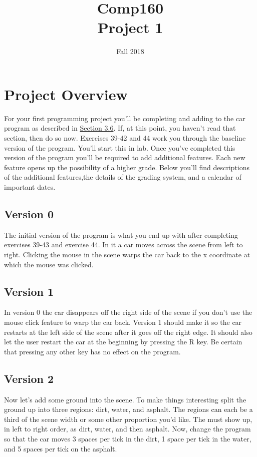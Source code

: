 \documentclass[10pt]{article}
\title{Comp160 \\ Project 1 }
\author{}
\date{ Fall 2018 }
\begin{document}
\maketitle

\section*{Project Overview}

For your first programming project you'll be completing and adding to the car program as described in \href{https://htdp.org/2018-01-06/Book/part_one.html#%28part._.D.K._sec~3adesign-world%29}{Section 3.6}.  If, at this point, you haven't read that section, then do so now. Exercises 39-42 and 44 work you through the baseline version of the program. You'll start this in lab. Once you've completed this version of the program you'll be required to add additional features. Each new feature opens up the possibility of a higher grade. Below you'll find descriptions of the additional features,the details of the grading system, and a calendar of important dates.

\subsection*{Version 0}

The initial version of the program is what you end up with after completing exercises 39-43 and exercise 44. In it a car moves across the scene from left to right. Clicking the mouse in the scene warps the car back to the x coordinate at which the mouse was clicked.

\subsection*{Version 1}

In version 0 the car disappears off the right side of the scene if you don't use the mouse click feature to warp the car back. Version 1 should make it so the car restarts at the left side of the scene after it goes off the right edge. It should also let the user restart the car at the beginning by pressing the R key. Be certain that pressing any other key has no effect on the program.

\subsection*{Version 2}

Now let's add some ground into the scene. To make things interesting split the ground up into three regions: dirt, water, and asphalt. The regions can each be a third of the scene width or some other proportion you'd like. The must show up, in left to right order, as dirt, water, and then asphalt. Now, change the program so that the car moves 3 spaces per tick in the dirt, 1 space per tick in the water, and 5 spaces per tick on the asphalt.
\end{document}
